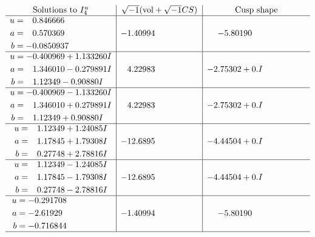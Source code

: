 \documentclass[1p]{elsarticle_modified}
\theoremstyle{definition}
\newcommand{\I}{\sqrt{-1}}
\begin{document}
$$\begin{array}{c|c|c}  
\text{Solutions to }I^u_{4}& \I (\text{vol} + \sqrt{-1}CS) & \text{Cusp shape}\\
 \hline 
\begin{aligned}
u &= \phantom{-}0.846666\phantom{ +0.000000I} \\
a &= \phantom{-}0.570369\phantom{ +0.000000I} \\
b &= -0.0850937\phantom{ +0.000000I}\end{aligned}
 & -1.40994\phantom{ +0.000000I} & -5.80190\phantom{ +0.000000I} \\ \hline\begin{aligned}
u &= -0.400969 + 1.133260 I \\
a &= \phantom{-}1.346010 - 0.279891 I \\
b &= \phantom{-}1.12349 - 0.90880 I\end{aligned}
 & \phantom{-}4.22983\phantom{ +0.000000I} & -2.75302 + 0. I\phantom{ +0.000000I} \\ \hline\begin{aligned}
u &= -0.400969 - 1.133260 I \\
a &= \phantom{-}1.346010 + 0.279891 I \\
b &= \phantom{-}1.12349 + 0.90880 I\end{aligned}
 & \phantom{-}4.22983\phantom{ +0.000000I} & -2.75302 + 0. I\phantom{ +0.000000I} \\ \hline\begin{aligned}
u &= \phantom{-}1.12349 + 1.24085 I \\
a &= \phantom{-}1.17845 + 1.79308 I \\
b &= \phantom{-}0.27748 + 2.78816 I\end{aligned}
 & -12.6895\phantom{ +0.000000I} & -4.44504 + 0. I\phantom{ +0.000000I} \\ \hline\begin{aligned}
u &= \phantom{-}1.12349 - 1.24085 I \\
a &= \phantom{-}1.17845 - 1.79308 I \\
b &= \phantom{-}0.27748 - 2.78816 I\end{aligned}
 & -12.6895\phantom{ +0.000000I} & -4.44504 + 0. I\phantom{ +0.000000I} \\ \hline\begin{aligned}
u &= -0.291708\phantom{ +0.000000I} \\
a &= -2.61929\phantom{ +0.000000I} \\
b &= -0.716844\phantom{ +0.000000I}\end{aligned}
 & -1.40994\phantom{ +0.000000I} & -5.80190\phantom{ +0.000000I}\\
 \hline 
 \end{array}$$\newpage
\end{document}
